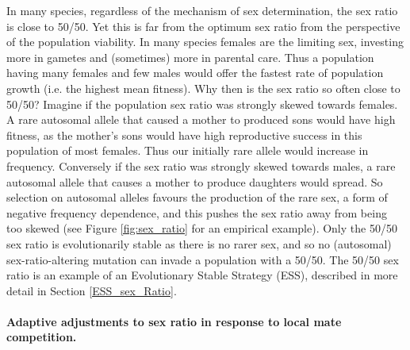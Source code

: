 {In many species, regardless of the mechanism of sex determination, the
sex ratio is close to 50/50. Yet this is far from the optimum sex
ratio from the perspective of the population viability. In many
species females are the limiting sex, investing more in gametes and
(sometimes) more in parental care. Thus a population having many
females and few males would offer the fastest rate of population
growth (i.e. the highest mean fitness). Why then is the sex ratio so
often close to 50/50?
Imagine if the population sex ratio was strongly skewed towards females. A rare autosomal allele that caused a mother to produced sons would have high fitness, as the mother's sons would have high reproductive success in this population of most females. Thus our initially rare allele would increase in frequency.
Conversely if the sex ratio was strongly skewed towards males, a rare autosomal allele that causes a mother to produce daughters would spread.
So selection on autosomal alleles favours the production of the rare
sex, a form of negative frequency dependence, and this pushes the sex
ratio away from being too skewed (see Figure \ref{fig:sex_ratio} for
an empirical example). Only the 50/50 sex ratio is evolutionarily stable as there is no rarer sex, and so no (autosomal) sex-ratio-altering mutation can invade a population with a 50/50.
The 50/50 sex ratio is an example of an Evolutionary Stable Strategy
(ESS), described in more detail in Section
\ref{ESS_sex_Ratio}.  %



\paragraph{Adaptive adjustments to sex ratio in response to local mate
  competition.}

}
